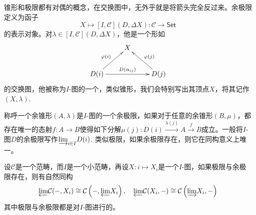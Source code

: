\begin{para}
锥形和极限都有对偶的概念，在交换图中，无外乎就是将箭头完全反过来。余极限定义为函子
\[
	X\mapsto [I,\mathcal{C}](D,\Delta X):\mathcal{C}\to \mathsf{Set}
\]
的表示对象。对$\lambda\in [I,\mathcal{C}](D,\Delta X)$，他是一个形如
\[
	\xymatrix{
		&X&\\
		D(i)\ar[rr]^-{D(\alpha_{ij})}\ar[ur]^{\varphi(i)}&&D(j)\ar[ul]_{\varphi(j)}
	}
\]
的交换图，他被称为$I$-图的一个，类似锥形，我们会特别写出其顶点$X$，将其记作$(X,\lambda)$.

称呼一个余锥形$(A,\lambda)$是$I$-图的一个{余极限}，如果对于任意的余锥形$(B,\mu)$，都存在唯一的态射$f:A\to B$使得如下分解$\mu(j):D(i)\xrightarrow{\lambda(j)}A\xrightarrow{f}B$成立。一般将$I$-图$D$的余极限写作${\varinjlim}_{i\in I} D(i)$. 类似极限，如果余极限存在，则它在同构意义上唯一。
\end{para}

\begin{pro}\label{homlimit}
设$\mathcal{C}$是一个范畴，而$I$是一个小范畴，再设$X:i\mapsto X_i$是一个$I$-图，如果极限与余极限存在，则有自然同构
\[
	{\varprojlim} \mathcal{C}(-,X_i)\cong \mathcal{C}\left(-,{\varprojlim} X_i\right),\quad {\varprojlim} \mathcal{C}(X_i,-)\cong  \mathcal{C}\left({\varinjlim} X_i,-\right)
\]
其中极限与余极限都是对$I$-图进行的。
\end{pro}

